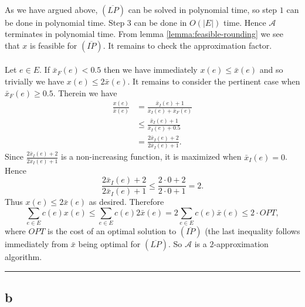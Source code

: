 \documentclass[letterpaper,12pt,oneside,onecolumn]{article}
\newcommand{\cA}{\mathcal{A}} \newcommand{\cB}{\mathcal{B}}
\newenvironment{proof}{{\bf Proof:  }}{\hfill\rule{2mm}{2mm}}
\begin{document}
\begin{proof}
\paragraph{}
As we have argued above, $(\overline{LP})$ can be solved in polynomial time, so step $1$ can be done in polynomial time. Step $3$ can be done in $O(|E|)$ time. Hence $\cA$ terminates in polynomial time. From lemma \ref{lemma:feasible-rounding} we see that $x$ is feasible for $(\overline{IP})$. It remains to check the approximation factor.
\paragraph{}
Let $e \in E$. If $\bar{x}_F(e) < 0.5$ then we have immediately $x(e) \leq \bar{x}(e)$ and so trivially we have $x(e) \leq 2\bar{x}(e)$. It remains to consider the pertinent case when $\bar{x}_F(e) \geq 0.5$. Therein we have
\begin{align*}
\frac{x(e)}{\bar{x}(e)} &= \frac{\bar{x}_I(e) + 1}{\bar{x}_I(e) + \bar{x}_F(e)} \\
&\leq  \frac{\bar{x}_I(e) + 1}{\bar{x}_I(e) +0.5} \\
&= \frac{2\bar{x}_I(e) + 2}{2\bar{x}_I(e) + 1}.
\end{align*}
Since $\frac{2\bar{x}_I(e) + 2}{2\bar{x}_I(e) + 1}$ is a non-increasing function, it is maximized when $\bar{x}_I(e) = 0$. Hence
$$\frac{2\bar{x}_I(e) + 2}{2\bar{x}_I(e) + 1} \leq \frac{2\cdot 0 + 2}{2\cdot 0 + 1} = 2.$$
Thus $x(e) \leq 2\bar{x}(e)$ as desired. Therefore
$$\sum_{e\in E}c(e) x(e) \leq \sum_{e \in E}c(e)2\bar{x}(e) = 2\sum_{e\in E}c(e)\bar{x}(e) \leq 2\cdot OPT,$$
where $OPT$ is the cost of an optimal solution to $(\overline{IP})$ (the last inequality follows immediately from $\bar{x}$ being optimal for $(\overline{LP})$. So $\cA$ is a $2$-approximation algorithm.
\end{proof}
\subsection*{b}
\end{document}
